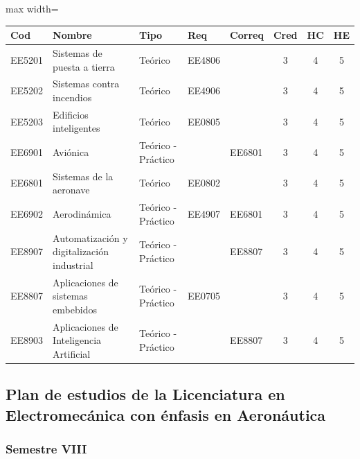 \begin{center}
\small
\begin{adjustbox}{max width=\textwidth}
\begin{tabular}{|>{\RaggedRight\arraybackslash}p{1.25cm}|>{\RaggedRight\arraybackslash}p{5.2cm}|>{\RaggedRight\arraybackslash}p{1.65cm}|p{1.25cm}|p{1.25cm}|c|c|c|}
\hline
\rowcolor{grisEncabezado}
Cod & Nombre & Tipo & Req & Correq & Cred & HC & HE \\ \hline
EE5201 & Sistemas de puesta a tierra & Teórico & EE4806 &  & 3 & 4 & 5 \\ \hline
\rowcolor{azulTabla}
EE5202 & Sistemas contra incendios & Teórico & EE4906 &  & 3 & 4 & 5 \\ \hline
EE5203 & Edificios inteligentes & Teórico & EE0805 &  & 3 & 4 & 5 \\ \hline
\rowcolor{azulTabla}
EE6901 & Aviónica & Teórico - Práctico &  & EE6801 & 3 & 4 & 5 \\ \hline
EE6801 & Sistemas de la aeronave & Teórico & EE0802 &  & 3 & 4 & 5 \\ \hline
\rowcolor{azulTabla}
EE6902 & Aerodinámica & Teórico - Práctico & EE4907 & EE6801 & 3 & 4 & 5 \\ \hline
EE8907 & Automatización y digitalización industrial & Teórico - Práctico &  & EE8807 & 3 & 4 & 5 \\ \hline
\rowcolor{azulTabla}
EE8807 & Aplicaciones de sistemas embebidos & Teórico - Práctico & EE0705 &  & 3 & 4 & 5 \\ \hline
EE8903 & Aplicaciones de Inteligencia Artificial & Teórico - Práctico &  & EE8807 & 3 & 4 & 5 \\ \hline
\end{tabular}
\end{adjustbox}
\end{center}

\subsection*{Plan de estudios de la Licenciatura en Electromecánica con énfasis en Aeronáutica}

\subsubsection*{Semestre VIII}


